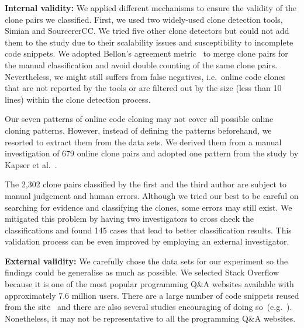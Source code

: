 \documentclass[10pt,journal,compsoc]{IEEEtran}
\begin{document}
\textbf{Internal validity:} 
We applied
different mechanisms to ensure the validity of the clone
pairs we classified.  First, we used two widely-used
clone detection tools, Simian and SourcererCC.  We tried five other
clone detectors but could not add them to the study due to their
scalability issues and susceptibility to incomplete code snippets.
We adopted Bellon's agreement metric~\cite{Bellon2007}
to merge clone pairs for the manual
classification and avoid double counting of the same clone pairs. 
Nevertheless, we might still suffers from false negatives, i.e.~online 
code clones that are not reported by the tools or are filtered 
out by the size (less than 10 lines) within the clone detection process.



Our seven patterns of online code cloning may not cover all possible online
cloning patterns. However, instead of defining the patterns beforehand, we
resorted to extract them from the data sets. We derived them from a manual
investigation of 679 online clone pairs and adopted one pattern from the study
by Kapser et al.~\cite{Kapser2003}.

The 2,302 clone pairs classified by the first and the third author are subject
to manual judgement and human errors.  Although we tried our best to be careful
on searching for evidence and classifying the clones, some errors may still
exist. We mitigated this problem by having two investigators to cross check the
classifications and found 145 cases that lead to better classification results.
This validation process can be even improved by employing an external
investigator. 


\textbf{External validity:} We carefully chose the data sets for our
experiment so the findings could be generalise as much as possible.
We selected Stack Overflow because it is one of the most popular
programming Q\&A websites available with approximately 7.6 million
users. There are a large number of code snippets reused from the
site~\cite{An2017} and there are also several studies encouraging of
doing
so~(e.g.~\cite{Ponzanelli2013,Ponzanelli2014,Keivanloo2014,Park2014}).
Nonetheless, it may not be representative to all the programming Q\&A
websites.
\end{document}

